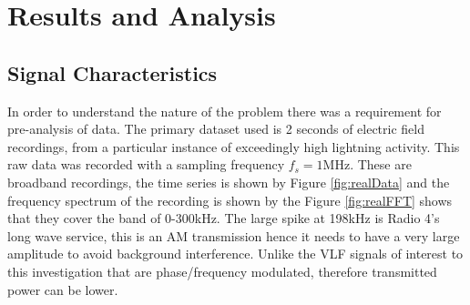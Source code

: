 \chapter{Results and Analysis}
\section{Signal Characteristics}\label{sec:sigChar}
In order to understand the nature of the problem there was a requirement for pre-analysis of data. The primary dataset used is 2 seconds of electric field recordings, from a particular instance of exceedingly high lightning activity. This raw data was recorded with a sampling frequency $f_s = 1\si{\mega\hertz}$. These are broadband recordings, the time series is shown by Figure \ref{fig:realData} and the frequency spectrum of the recording is shown by the Figure \ref{fig:realFFT} shows that they cover the band of 0-300\si{\kilo\hertz}. The large spike at 198kHz is Radio 4's long wave service, this is an AM transmission hence it needs to have a very large amplitude to avoid background interference. Unlike the VLF signals of interest to this investigation that are phase/frequency modulated, therefore transmitted power can be lower.


